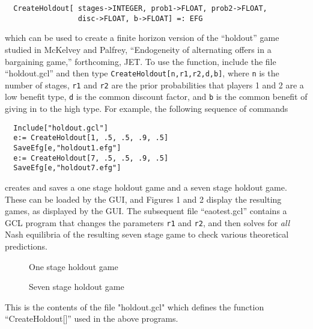 \begin{verbatim}
  CreateHoldout[ stages->INTEGER, prob1->FLOAT, prob2->FLOAT, 
                 disc->FLOAT, b->FLOAT] =: EFG
\end{verbatim}

\noindent
which can be used to create a finite horizon version of the
``holdout'' game studied in McKelvey and Palfrey, ``Endogeneity of
alternating offers in a bargaining game,'' forthcoming, JET.  To use
the function, include the file ``holdout.gcl'' and then type
\verb+CreateHoldout[n,r1,r2,d,b]+, where \verb+n+ is the number of
stages, \verb+r1+ and \verb+r2+ are the prior probabilities that
players 1 and 2 are a low benefit type, \verb+d+ is the common
discount factor, and \verb+b+ is the common benefit of giving in to
the high type.  For example, the following sequence of commands

\begin{verbatim}
  Include["holdout.gcl"]
  e:= CreateHoldout[1, .5, .5, .9, .5]
  SaveEfg[e,"holdout1.efg"]
  e:= CreateHoldout[7, .5, .5, .9, .5]
  SaveEfg[e,"holdout7.efg"]
\end{verbatim}

\noindent
creates and saves a one stage holdout game and a seven stage holdout
game. These can be loaded by the GUI, and Figures 1 and 2 display the
resulting games, as displayed by the GUI.  The subsequent file
``eaotest.gcl'' contains a GCL program that changes the parameters
\verb+r1+ and \verb+r2+, and then solves for {\em all} Nash equilibria
of the resulting seven stage game to check various theoretical predictions.

\begin{figure}[htp]
\caption{One stage holdout game}
\end{figure}
\begin{figure}[htp]
\caption{Seven stage holdout game}
\end{figure}

\newpage
\noindent
This is the contents of the file "holdout.gcl" which defines the
function ``CreateHoldout[]'' used in the above programs.

